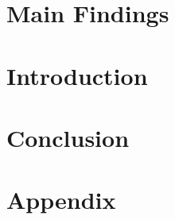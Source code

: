 \documentclass[a4paper,draft]{scrreprt}
\begin{document}

\chapter{Main Findings} %

\chapter{Introduction}

\chapter{Conclusion}

\chapter{Appendix}






\end{document}
